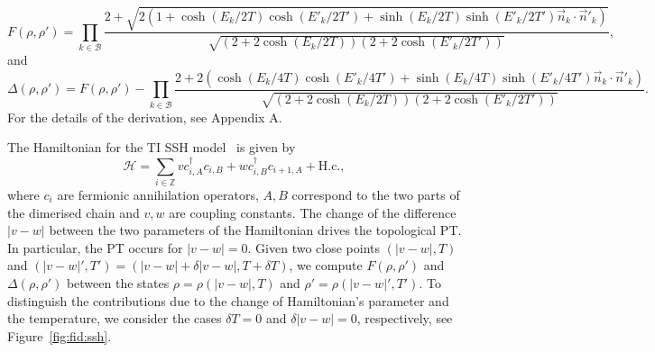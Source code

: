 \begin{equation}
F(\rho,\rho')=\prod_{k\in\mathcal{B}}\frac{2+\sqrt{2\left(1+\cosh(E_k/2T)\cosh(E'_k/2T')+\sinh(E_k/2T)\sinh(E'_k/2T')\vec{n}_k\cdot\vec{n}'_k\right)}}{\sqrt{(2+ 2\cosh (E_k/2T))(2+2\cosh (E'_k/2T'))}},
\end{equation}
and 
\begin{equation}
\Delta(\rho,\rho')=F(\rho,\rho')-\prod_{k\in \mathcal{B}}\frac{2+2\left(\cosh(E_k/4T)\cosh(E'_k/4T')+\sinh(E_k/4T)\sinh(E'_k/4T')\vec{n}_k\cdot\vec{n}'_k\right)}{\sqrt{(2+ 2\cosh (E_k/2T))(2+2\cosh (E'_k/2T'))}}.
\end{equation}
For the details of the derivation, see Appendix A.

The Hamiltonian for the TI SSH model~\cite{su:sch:hee:79} is given by
\begin{equation}
\mathcal{H}=\sum_{i\in\mathbb{Z}}v c^{\dagger}_{i,A}c_{i,B}+w c^{\dagger}_{i,B}c_{i+1,A}+\text{H.c.},
\end{equation}
where $c_i$ are fermionic annihilation operators, $A,B$ correspond to the two parts of the dimerised chain and $v,w$ are coupling constants. The change of the difference $|v-w|$ between the two parameters of the Hamiltonian drives the topological PT. In particular, the PT occurs for $|v-w|=0$. Given two close points $(|v-w|,T)$ and $(|v-w|',T')=(|v-w|+\delta |v-w|, T+\delta T)$, we compute $F(\rho,\rho')$ and $\Delta(\rho,\rho')$ between the states $\rho=\rho(|v-w|,T)$ and $\rho'=\rho(|v-w|',T')$. To distinguish the contributions due to the change of Hamiltonian's parameter and the temperature, we consider the cases $\delta T = 0$ and $\delta |v-w| = 0$, respectively, see Figure~\ref{fig:fid:ssh}.

